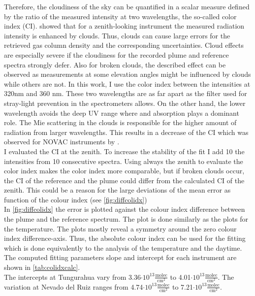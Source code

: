 Therefore, the cloudiness of the sky can be quantified in a scalar measure defined by the ratio of the measured intensity at two wavelengths, the so-called color index (CI).
\cite{wagner2014cloud} showed that for a zenith-looking instrument the measured radiation intensity is enhanced by clouds. Thus, clouds can cause large errors for the retrieved gas column density and the corresponding uncertainties. 
Cloud effects are especially severe if the cloudiness for the recorded plume and reference spectra strongly defer. Also for broken clouds, the described effect can be observed as measurements at some elevation angles might be influenced by clouds while others are not.
In this work, I use the color index between the intensities at 320nm and 360 nm.
These two wavelengths are as far apart as the filter used for stray-light prevention in the spectrometers allows.
On the other hand, the lower wavelength avoids the deep UV range where  and   absorption plays a dominant role.
The Mie scattering in the clouds is responsible for the higher amount of radiation from larger wavelengths. This results in a decrease of the CI which was observed for NOVAC instruments by \citet{lubcke2014optical}.\\
I evaluated the CI at the zenith. To increase the stability of the fit I add 10 the intensities from 10 consecutive spectra. Using always the zenith to evaluate the color index makes the color index more comparable, but if broken clouds occur, the CI of the reference and the plume could differ from the calculated CI of the zenith. This could be a reason for the large deviations of the mean  error as function of the colour index (see \cref{fig:diffcolidx})\\
In \cref{fig:diffcolidx} the  error is plotted against the colour index difference between the plume and the reference spectrum. The plot is done similarly as the plots for the temperature.
The plots mostly reveal a symmetry around the zero colour index difference-axis. Thus, the absolute colour index can be used for the fitting which is done equivalently to the analysis of the temperature and the daytime. The computed fitting parameters slope and intercept for each instrument are shown in \cref{tab:colidxcalc}. \\
The intercepts at Tungurahua vary from 3.36$\cdot10^{13}\frac{\text{molec}}{\text{cm}^2}$ to 4.01$\cdot10^{13}\frac{\text{molec}}{\text{cm}^2}$. The variation at Nevado del Ruiz ranges from  4.74$\cdot10^{13}\frac{\text{molec}}{\text{cm}^2}$ to 7.21$\cdot10^{13}\frac{\text{molec}}{\text{cm}^2}$.\\
